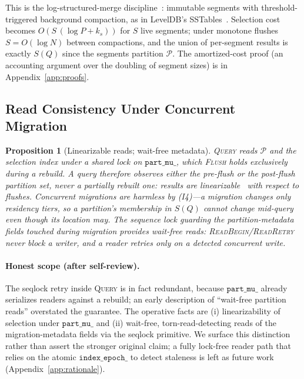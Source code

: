 \documentclass[10pt]{article}
\newtheorem{proposition}{Proposition}
\theoremstyle{definition}
\begin{document}
This is the log-structured-merge discipline~\citep{oneil1996lsm}: immutable segments
with threshold-triggered background compaction, as in LevelDB's
SSTables~\citep{leveldb}. Selection cost becomes $O(S\,(\log P + k_s))$ for $S$ live
segments; under monotone flushes $S=O(\log N)$ between compactions, and the union of
per-segment results is exactly $S(Q)$ since the segments partition $\mathcal{P}$.
The amortized-cost proof (an accounting argument over the doubling of segment sizes)
is in Appendix~\ref{app:proofs}.

\subsection{Read Consistency Under Concurrent Migration}
\label{sec:consistency}

\begin{proposition}[Linearizable reads; wait-free metadata]
\label{prop:read}
\textsc{Query} reads $\mathcal{P}$ and the selection index under a shared lock on
$\texttt{part\_mu\_}$, which \textsc{Flush} holds exclusively during a rebuild. A
query therefore observes either the pre-flush or the post-flush partition set, never
a partially rebuilt one: results are linearizable~\citep{herlihy1990linearizability}
with respect to flushes. Concurrent migrations are harmless by (I4)---a migration
changes only residency tiers, so a partition's membership in $S(Q)$ cannot change
mid-query even though its location may. The sequence lock guarding the
partition-metadata fields touched during migration provides wait-free reads:
\textsc{ReadBegin}/\textsc{ReadRetry} never block a writer, and a reader retries only
on a detected concurrent write.
\end{proposition}

\paragraph{Honest scope (after self-review).}
The seqlock retry inside \textsc{Query} is in fact redundant, because
$\texttt{part\_mu\_}$ already serializes readers against a rebuild; an early
description of ``wait-free partition reads'' overstated the guarantee. The operative
facts are (i) linearizability of selection under $\texttt{part\_mu\_}$ and (ii)
wait-free, torn-read-detecting reads of the migration-metadata fields via the
seqlock primitive. We surface this distinction rather than assert the stronger
original claim; a fully lock-free reader path that relies on the atomic
$\texttt{index\_epoch\_}$ to detect staleness is left as future work
(Appendix~\ref{app:rationale}).
\end{document}
